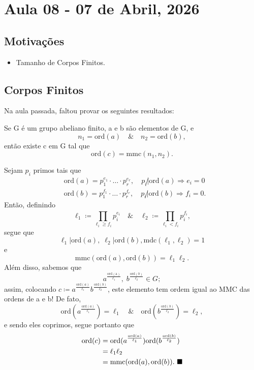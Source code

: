 \documentclass[../algebraIII_notes.tex]{subfiles}
\begin{document}
\section{Aula 08 - 07 de Abril, 2026}
\subsection{Motivações}
\begin{itemize}
	\item Tamanho de Corpos Finitos.
\end{itemize}
\subsection{Corpos Finitos}
Na aula passada, faltou provar os seguintes resultados:
\begin{lemma*}
	Se G é um grupo abeliano finito, a e b são elementos de G, e
	\[
		n_1 = \mathrm{ord}(a) \quad\&\quad n_2=\mathrm{ord}(b),
	\]
	então existe c em G tal que
	\[
		\mathrm{ord}(c)= \mathrm{mmc}(n_1, n_2).
	\]
\end{lemma*}
\begin{proof*}
	Sejam \(p_{i}\) primos tais que
	\begin{align*}
		 & \mathrm{ord}(a) = p_{1}^{e_1}\cdot \dotsc \cdot p_{r}^{e_{r}}, \quad p_{i}\not| \mathrm{ord}(a) \Rightarrow e_{i}=0  \\
		 & \mathrm{ord}(b) = p_{1}^{f_1}\cdot \dotsc \cdot p_{r}^{f_{r}}, \quad p_{i}\not| \mathrm{ord}(b) \Rightarrow f_{i}=0.
	\end{align*}
	Então, definindo
	\[
		\ell_{1} \coloneqq \prod\limits_{\ell_{i}\geq f_{i}}^{}p_{i}^{e_{i}} \quad\&\quad \ell_{2}\coloneqq \prod\limits_{\ell_{i} < f_{i}}^{}p_{i}^{f_{i}},
	\]
	segue que
	\[
		\ell_1 | \mathrm{ord}(a),\; \ell_2 | \mathrm{ord}(b), \mathrm{mdc}(\ell_1, \ell_2) = 1
	\]
	e
	\[
		\mathrm{mmc}(\mathrm{ord}(a), \mathrm{ord}(b))=\ell_1 \ell_2.
	\]
	Além disso, sabemos que
	\[
		a^{\frac{\mathrm{ord(a)}}{\ell_1}},\; b^{\frac{\mathrm{ord}(b)}{\ell_{2}}}\in G;
	\]
	assim, colocando \(c\coloneqq a^{\frac{\mathrm{ord}(a)}{\ell_1}}b^{\frac{\mathrm{ord}(b)}{\ell_2}}\), este elemento tem ordem igual ao MMC das ordens de a e b! De fato,
	\[
		\mathrm{ord}(a^{\frac{\mathrm{ord}(a)}{\ell_1}}) = \ell_1 \quad\&\quad \mathrm{ord}(b^{\frac{\mathrm{ord}(b)}{\ell_2}}) = \ell_{2},
	\]
	e sendo eles coprimos, segue portanto que
	\begin{align*}
		\mathrm{ord}(c) & = \mathrm{ord}(a^{\frac{\mathrm{ord}(a)}{\ell_1}})\mathrm{ord}(b^{\frac{\mathrm{ord}(b)}{\ell_2}}) \\
		                & = \ell_1 \ell _2                                                                                   \\
		                & = \mathrm{mmc}(\mathrm{ord}(a), \mathrm{ord}(b)). \text{ $\blacksquare$}
	\end{align*}
\end{proof*}
\end{document}
